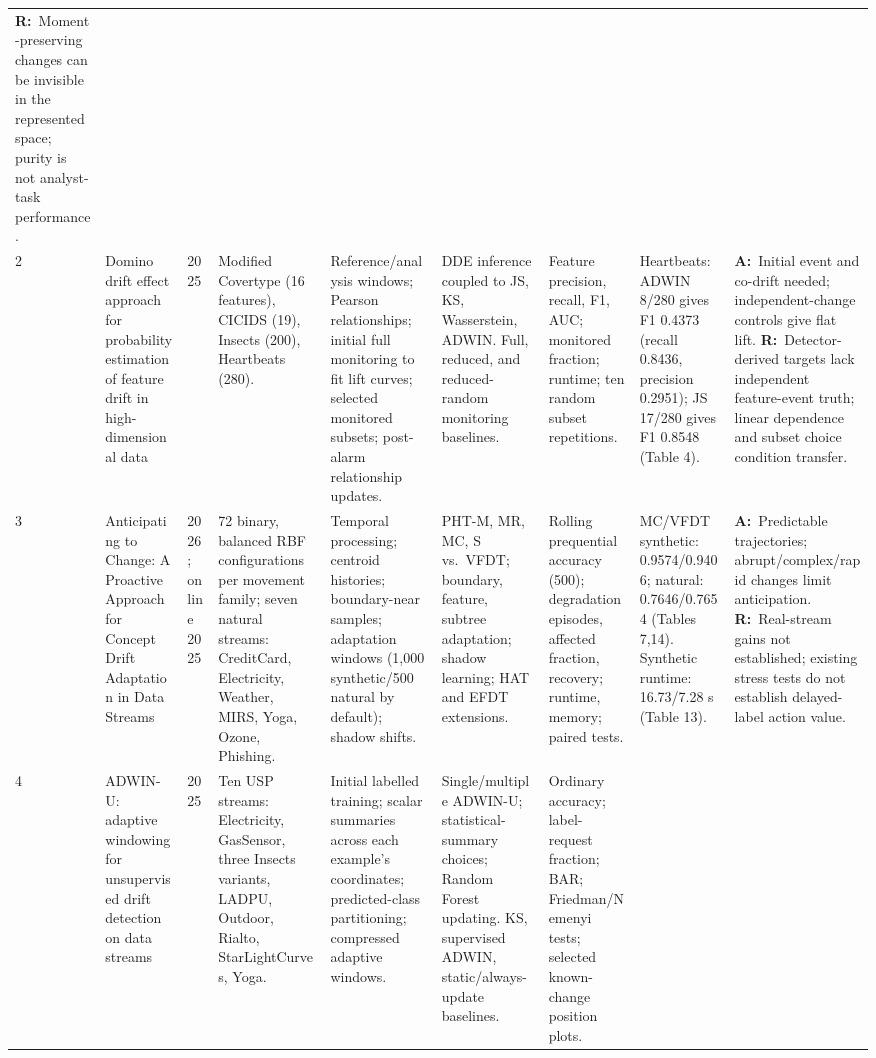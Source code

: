 \documentclass[10pt,a4paper]{article}
\newcommand{\A}{\textbf{A:}\ }
\newcommand{\R}{\textbf{R:}\ }
\begin{document}
\begin{landscape}
\begin{longtable}{L{0.4cm}L{3.5cm}L{0.95cm}L{2.55cm}L{2.65cm}L{2.65cm}L{2.25cm}L{2.65cm}L{3.8cm}}
\R Moment-preserving changes can be invisible in the represented space; purity is not analyst-task performance.\\[4pt]
2 & Domino drift effect approach for probability estimation of feature drift in high-dimensional data \cite{szucs} &
2025 & Modified Covertype (16 features), CICIDS (19), Insects (200), Heartbeats (280). &
Reference/analysis windows; Pearson relationships; initial full monitoring to fit lift curves; selected monitored subsets; post-alarm relationship updates. &
DDE inference coupled to JS, KS, Wasserstein, ADWIN. Full, reduced, and reduced-random monitoring baselines. &
Feature precision, recall, F1, AUC; monitored fraction; runtime; ten random subset repetitions. &
Heartbeats: ADWIN 8/280 gives F1 0.4373 (recall 0.8436, precision 0.2951); JS 17/280 gives F1 0.8548 (Table 4). &
\A Initial event and co-drift needed; independent-change controls give flat lift.
\R Detector-derived targets lack independent feature-event truth; linear dependence and subset choice condition transfer.\\[4pt]
3 & Anticipating to Change: A Proactive Approach for Concept Drift Adaptation in Data Streams \cite{guerrero} &
2026; online 2025 & 72 binary, balanced RBF configurations per movement family; seven natural streams: CreditCard, Electricity, Weather, MIRS, Yoga, Ozone, Phishing. &
Temporal processing; centroid histories; boundary-near samples; adaptation windows (1,000 synthetic/500 natural by default); shadow shifts. &
PHT-M, MR, MC, S vs.\ VFDT; boundary, feature, subtree adaptation; shadow learning; HAT and EFDT extensions. &
Rolling prequential accuracy (500); degradation episodes, affected fraction, recovery; runtime, memory; paired tests. &
MC/VFDT synthetic: 0.9574/0.9406; natural: 0.7646/0.7654 (Tables 7,14). Synthetic runtime: 16.73/7.28 s (Table 13). &
\A Predictable trajectories; abrupt/complex/rapid changes limit anticipation.
\R Real-stream gains not established; existing stress tests do not establish delayed-label action value.\\[4pt]
4 & ADWIN-U: adaptive windowing for unsupervised drift detection on data streams \cite{assis} &
2025 & Ten USP streams: Electricity, GasSensor, three Insects variants, LADPU, Outdoor, Rialto, StarLightCurves, Yoga. &
Initial labelled training; scalar summaries across each example's coordinates; predicted-class partitioning; compressed adaptive windows. &
Single/multiple ADWIN-U; statistical-summary choices; Random Forest updating. KS, supervised ADWIN, static/always-update baselines. &
Ordinary accuracy; label-request fraction; BAR; Friedman/Nemenyi tests; selected known-change position plots. &

\end{longtable}
\end{landscape}
\end{document}

